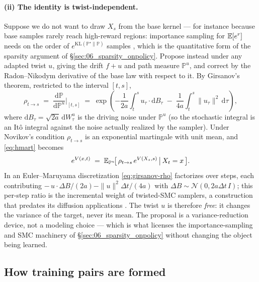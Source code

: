 \paragraph{(ii) The identity is twist-independent.}
Suppose we do not want to draw $X_s$ from the base kernel --- for instance
because base samples rarely reach high-reward regions: importance sampling for
$\mathbb{E}[e^{r}]$ needs on the order of $e^{\mathrm{KL}(\mathbb{P}^{\star}\|\mathbb{P})}$
samples \citep{chatterjee2018sample}, which is the quantitative form of the
sparsity argument of \S\ref{sec:06_sparsity_onpolicy}. Propose instead under any adapted twist
$u$, giving the drift $f+u$ and path measure $\mathbb{P}^{u}$, and correct by
the Radon--Nikodym derivative of the base law with respect to it. By Girsanov's
theorem, restricted to the interval $[t,s]$,
\begin{equation}
  \rho_{t\to s} \;=\; \frac{\mathrm{d}\mathbb{P}}{\mathrm{d}\mathbb{P}^{u}}
  \bigg|_{[t,s]}
  \;=\; \exp\!\left(
    -\frac{1}{2a}\int_t^s u_\tau\cdot \mathrm{d}B_\tau
    \;-\; \frac{1}{4a}\int_t^s \|u_\tau\|^{2}\,\mathrm{d}\tau
  \right),
  \label{eq:girsanov-rho}
\end{equation}
where $\mathrm{d}B_\tau=\sqrt{2a}\,\mathrm{d}W^{u}_\tau$ is the driving noise
under $\mathbb{P}^{u}$ (so the stochastic integral is an It\^o integral against
the noise actually realized by the sampler). Under Novikov's condition
$\rho_{t\to s}$ is an exponential martingale with unit mean, and \eqref{eq:hmart}
becomes
\begin{equation}
  e^{V(x,t)} \;=\; \mathbb{E}_{\mathbb{P}^{u}}\!\big[\,\rho_{t\to s}\, e^{V(X_s,s)}\,\big|\,X_t=x\,\big].
  \label{eq:girsanov}
\end{equation}
In an Euler--Maruyama discretization \eqref{eq:girsanov-rho} factorizes over
steps, each contributing
$-\,u\cdot\Delta B/(2a) - \|u\|^{2}\Delta t/(4a)$ with
$\Delta B\sim\mathcal{N}(0,2a\Delta t\,I)$; this per-step ratio is the
incremental weight of twisted-SMC samplers, a construction that predates its
diffusion applications
\citep{whiteley2014twisted,guarniero2017iapf,heng2020csmc,singhal2025fksteering}. The twist $u$ is therefore \emph{free}: it
changes the variance of the target, never its mean. The proposal is a
variance-reduction device, not a modeling choice --- which is what licenses the
importance-sampling and SMC machinery of \S\ref{sec:06_sparsity_onpolicy}
without changing the object being learned.

\subsection{How training pairs are formed}
\label{subsec:targets}

